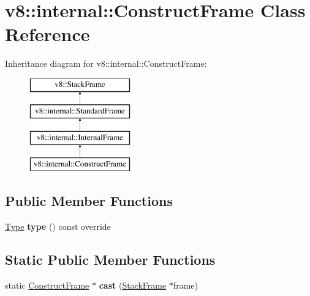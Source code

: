 \hypertarget{classv8_1_1internal_1_1_construct_frame}{}\section{v8\+:\+:internal\+:\+:Construct\+Frame Class Reference}
\label{classv8_1_1internal_1_1_construct_frame}
Inheritance diagram for v8\+:\+:internal\+:\+:Construct\+Frame\+:\begin{figure}[H]
\begin{center}
\leavevmode
\includegraphics[height=4.000000cm]{classv8_1_1internal_1_1_construct_frame}
\end{center}
\end{figure}
\subsection*{Public Member Functions}
\begin{DoxyCompactItemize}
\item 
\hyperlink{classv8_1_1internal_1_1_type}{Type} {\bfseries type} () const  override\hypertarget{classv8_1_1internal_1_1_construct_frame_afafd59191786614ef4b390edf2968843}{}\label{classv8_1_1internal_1_1_construct_frame_afafd59191786614ef4b390edf2968843}

\end{DoxyCompactItemize}
\subsection*{Static Public Member Functions}
\begin{DoxyCompactItemize}
\item 
static \hyperlink{classv8_1_1internal_1_1_construct_frame}{Construct\+Frame} $\ast$ {\bfseries cast} (\hyperlink{classv8_1_1_stack_frame}{Stack\+Frame} $\ast$frame)\hypertarget{classv8_1_1internal_1_1_construct_frame_a605f22c838c4e877e620d070898d219c}{}\label{classv8_1_1internal_1_1_construct_frame_a605f22c838c4e877e620d070898d219c}

\end{DoxyCompactItemize}

